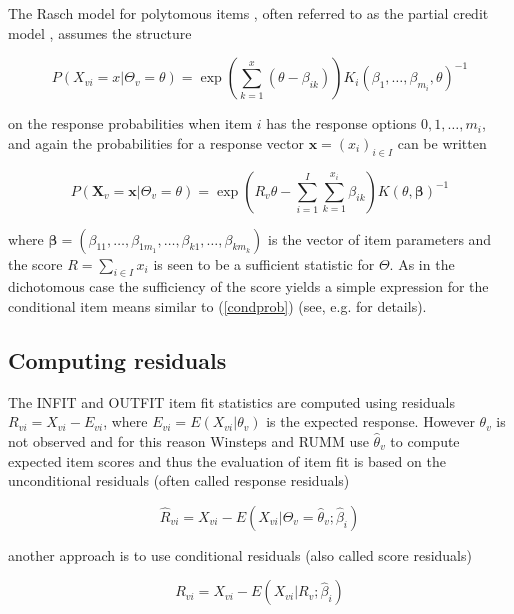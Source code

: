 \documentclass{article}
\begin{document}
The Rasch model for polytomous items \cite{rasch1961,andersen1977,andrich1978}, often referred to as the partial credit model \cite{Masters1982}, assumes the structure

\begin{equation}
P(X_{vi}=x|\Theta_v=\theta)=\exp\left(\sum_{k=1}^x(\theta-\beta_{ik})\right)K_i(\beta_1,\ldots,\beta_{m_i},\theta)^{-1}
\end{equation}

on the response probabilities when item $i$ has the response options $0,1,\ldots,m_i$, and again the probabilities for a response vector $\boldsymbol{x}=(x_i)_{i\in I}$ can be written

\begin{equation}
P(\boldsymbol{X}_v=\boldsymbol{x}|\Theta_v=\theta)
= \exp\left(R_v\theta-\sum_{i=1}^{I}\sum_{k=1}^{x_i}\beta_{ik}\right)
K(\theta,\boldsymbol{\beta})^{-1}
\end{equation}

where $\boldsymbol{\beta}=(\beta_{11},\ldots,\beta_{1m_1},\ldots,\beta_{k1},\ldots,\beta_{km_k})$ is the vector of item parameters and the score $R=\sum_{i\in I}x_i$ is seen to be a sufficient statistic for $\Theta$. As in the dichotomous case the sufficiency of the score yields a simple expression for the conditional item means similar to (\ref{condprob}) (see, e.g. \cite{Andersen_1995} for details).

\subsection{Computing residuals}


The INFIT and OUTFIT item fit statistics are computed using residuals $R_{vi}=X_{vi}-E_{vi}$, where $E_{vi}=E(X_{vi}|\theta_v)$ is the expected response. However $\theta_v$ is not observed and for this reason Winsteps \cite{winsteps} and RUMM \cite{RUMM} use $\hat\theta_v$ to compute expected item scores and thus the evaluation of item fit is based on the unconditional residuals (often called response residuals)

\begin{equation}
\hat{R}_{vi}=X_{vi} - E(X_{vi}|\Theta_v=\hat\theta_v;\hat\beta_i)
\label{responseresiduals}
\end{equation}

another approach is to use conditional residuals (also called score residuals)

\begin{equation}
R_{vi} = X_{vi} - E(X_{vi}|R_v;\hat\beta_i)
\label{scoreresiduals}
\end{equation}
\end{document}
